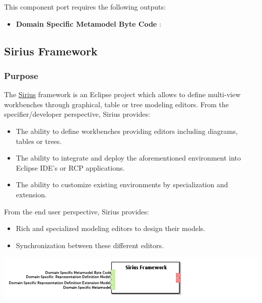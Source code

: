 \documentclass{gemoc} %
\begin{document}
This component port requires the following outputs:
\begin{itemize}
  \item \textbf{Domain Specific Metamodel Byte Code} :
\end{itemize}

\subsection{Sirius Framework}


\subsubsection{Purpose}
The \href{http://www.eclipse.org/proposals/modeling.sirius/}{Sirius} framework is an Eclipse project which allows to define multi-view workbenches through graphical, table or tree modeling editors.
From the specifier/developer perspective, Sirius provides:
\begin{itemize}
\item The ability to define workbenches providing editors including diagrams, tables or trees.
\item The ability to integrate and deploy the aforementioned environment into Eclipse IDE’s or RCP applications.
\item The ability to customize existing environments by specialization and extension.
\end{itemize}
From the end user perspective, Sirius provides:
\begin{itemize}
\item Rich and specialized modeling editors to design their models.
\item Synchronization between these different editors.
\end{itemize}
\begin{center}
\includegraphics*[trim=0.0cm 0.0cm 0cm 0.0cm, clip=true]{../images/generated/Generated_Sirius_Framework.png}
\end{center}
\end{document}
